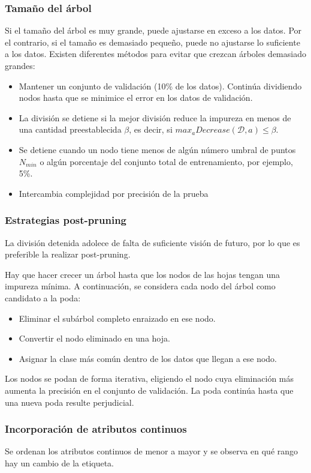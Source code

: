 \subsubsection{Tamaño del árbol}
Si el tamaño del árbol es muy grande, puede ajustarse en exceso a los datos. Por el contrario, si el tamaño es demasiado pequeño, puede no ajustarse lo suficiente a los datos.
Existen diferentes métodos para evitar que crezcan árboles demasiado grandes:
\begin{itemize}
\item Mantener un conjunto de validación (10\% de los datos). Continúa dividiendo nodos hasta que se minimice el error en los datos de validación.
\item La división se detiene si la mejor división reduce la impureza en menos de una cantidad preestablecida $\beta$, es decir, si $max_a Decrease(\mathcal{D}, a) \leq \beta$.
\item Se detiene cuando un nodo tiene menos de algún número umbral de puntos$N_{min}$ o algún porcentaje del conjunto total de entrenamiento, por ejemplo, 5\%.
\item Intercambia complejidad por precisión de la prueba
\end{itemize}

\subsubsection{Estrategias post-pruning}
La división detenida adolece de falta de suficiente visión de futuro, por lo que es preferible la realizar post-pruning.

Hay que hacer crecer un árbol hasta que los nodos de las hojas tengan una impureza mínima. A continuación, se considera cada nodo del árbol como candidato a la poda:
\begin{itemize}
\item Eliminar el subárbol completo enraizado en ese nodo.
\item Convertir el nodo eliminado en una hoja.
\item Asignar la clase más común dentro de los datos que llegan a ese nodo.
\end{itemize}

Los nodos se podan de forma iterativa, eligiendo el nodo cuya eliminación más aumenta la precisión en el conjunto de validación. La poda continúa hasta que una nueva poda resulte perjudicial.

\subsubsection{Incorporación de atributos continuos}
Se ordenan los atributos continuos de menor a mayor y se observa en qué rango hay un cambio de la etiqueta.


